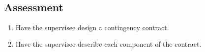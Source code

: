 \subsection{Assessment}
\begin{enumerate}
\item Have the supervisee design a contingency contract.
\item Have the supervisee describe each component of the contract.
\end{enumerate}
%
